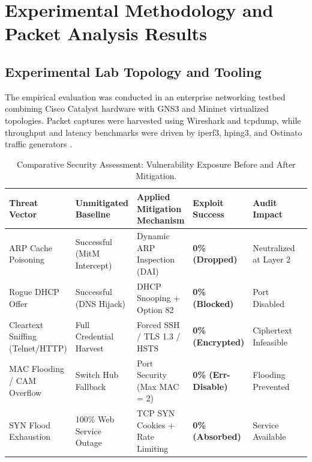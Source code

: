 \section{Experimental Methodology and Packet Analysis Results}

\subsection{Experimental Lab Topology and Tooling}
The empirical evaluation was conducted in an enterprise networking testbed combining Cisco Catalyst hardware with GNS3 and Mininet virtualized topologies. Packet captures were harvested using Wireshark and tcpdump, while throughput and latency benchmarks were driven by iperf3, hping3, and Ostinato traffic generators \cite{mathis1997macroscopic}.

\begin{table}[H]
\centering
\caption{Comparative Security Assessment: Vulnerability Exposure Before and After Mitigation.}
\label{tab:net_comp}
\begin{tabularx}{\linewidth}{lXXXXX}
\toprule
\textbf{Threat Vector} & \textbf{Unmitigated Baseline} & \textbf{Applied Mitigation Mechanism} & \textbf{Exploit Success} & \textbf{Audit Impact} \\
\midrule
ARP Cache Poisoning & Successful (MitM Intercept) & Dynamic ARP Inspection (DAI) & \textbf{0\% (Dropped)} & Neutralized at Layer 2 \\
Rogue DHCP Offer & Successful (DNS Hijack) & DHCP Snooping + Option 82 & \textbf{0\% (Blocked)} & Port Disabled \\
Cleartext Sniffing (Telnet/HTTP) & Full Credential Harvest & Forced SSH / TLS 1.3 / HSTS & \textbf{0\% (Encrypted)} & Ciphertext Infeasible \\
MAC Flooding / CAM Overflow & Switch Hub Fallback & Port Security (Max MAC = 2) & \textbf{0\% (Err-Disable)} & Flooding Prevented \\
SYN Flood Exhaustion & 100\% Web Service Outage & TCP SYN Cookies + Rate Limiting & \textbf{0\% (Absorbed)} & Service Available \\
\bottomrule
\end{tabularx}
\end{table}

